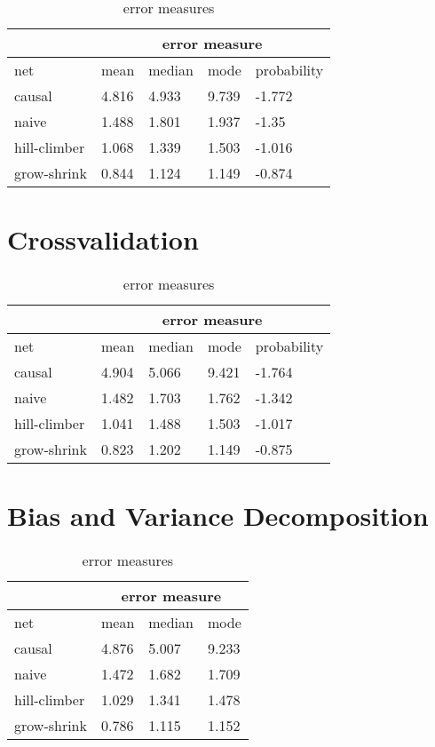 \begin{table}[h]
\centering
\begin{tabular}{ l l l l l  }
 \hline
  & \multicolumn{4}{c}{error measure} \\
 \hline
 net & mean & median & mode & probability\\
 \hline
 causal   & 4.816    & 4.933  & 9.739   &-1.772\\
 naive   & 1.488      & 1.801 & 1.937  &-1.35\\
 hill-climber   & 1.068      & 1.339 & 1.503  &-1.016\\
 grow-shrink   & 0.844     & 1.124  & 1.149 &-0.874\\
\end{tabular}
\caption[Validation Error]{error measures}
\label{tab:2}
\end{table}

\section{Crossvalidation}

\begin{table}[h]
\centering
\begin{tabular}{ l l l l l  }
 \hline
  & \multicolumn{4}{c}{error measure} \\
 \hline
 net & mean & median & mode & probability\\
 \hline
 causal   & 4.904    & 5.066  & 9.421   &-1.764\\
 naive   & 1.482      & 1.703 & 1.762  &-1.342\\
 hill-climber   & 1.041      & 1.488 & 1.503  &-1.017\\
 grow-shrink   & 0.823     & 1.202  & 1.149 &-0.875\\
 
\end{tabular}
\caption[Crossvalidation Error]{error measures}
\label{tab:3}
\end{table}

\section{Bias and Variance Decomposition}

\begin{table}[h]
\centering
\begin{tabular}{ l l l l }
 \hline
 & \multicolumn{3}{c}{error measure} \\
 \hline
 net & mean & median & mode\\
 \hline
 causal & 4.876 & 5.007 & 9.233\\
 naive & 1.472 & 1.682 & 1.709\\
 hill-climber & 1.029 & 1.341 & 1.478\\
 grow-shrink & 0.786 & 1.115 & 1.152\\
\end{tabular}
\caption[Bias]{error measures}
\label{tab:4}
\end{table}

